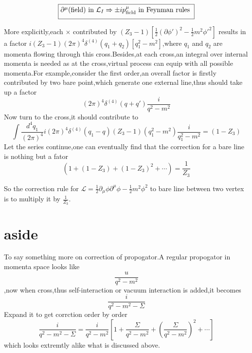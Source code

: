 \documentclass[a4paper]{article}
\begin{document}
\[
\fbox{%
	$\partial^\mu(\text{field}) \text{ in } \mathcal{L}_I 
	\xRightarrow{ }
	\pm i p^\mu_{\text{field}} \text{ in Feynman rules}$
}
\]

More explicitly,each $\times$ contributed by $(Z_3-1)[\frac{1}{2}(\partial\phi')^2-\frac{1}{2}m^2\phi'^2]$ results in a factor $i(Z_3-1)(2\pi)^4\delta^{(4)}(q_1+q_2)[q_1^2-m^2]$,where $q_1$ and $q_2$ are momenta flowing through this cross.Besides,at each cross,an integral over internal momenta is needed as at the cross,virtual process can equip with all possible momenta.For example,consider the first order,an overall factor is firstly contributed by two bare point,which generate one external line,thus should take up a factor$$(2\pi)^4\delta^{(4)}(q+q')\frac{i}{q^2-m^2}$$
Now turn to the cross,it should contribute to$$\int \frac{d^4 q_1}{(2\pi)^4}i(2\pi)^4\delta^{(4)}(q_1-q)(Z_3-1)(q_1^2-m^2)\frac{i}{q_1^2-m^2}=(1-Z_3)$$Let the series continue,one can eventually find that the correction for a bare line is nothing but a fator $$(1+(1-Z_3)+(1-Z_3)^2+\cdots)=\frac{1}{Z_3}$$\par So the correction rule for $\mathscr{L}=\frac{1}{2}\partial_{\mu}\phi\partial^{\mu}\phi-\frac{1}{2}m^2\phi^2$ to bare line between two vertex is to multiply it by $\frac{1}{Z_3}$.
\section{aside}
To say something more on correction of propogator.A regular propogator in momenta space looks like$$\frac{u}{q^2-m^2}$$,now when cross,thus self-interaction or vacuum interaction is added,it becomes$$\frac{i}{q^2-m^2-\Sigma}$$Expand it to get corrction order by order$$\frac{i}{q^2-m^2-\Sigma}=\frac{i}{q^2-m^2}[1+\frac{\Sigma}{q^2-m^2}+(\frac{\Sigma}{q^2-m^2})^2+\cdots]$$which looks extremtly alike what is discussed above.
\end{document}
